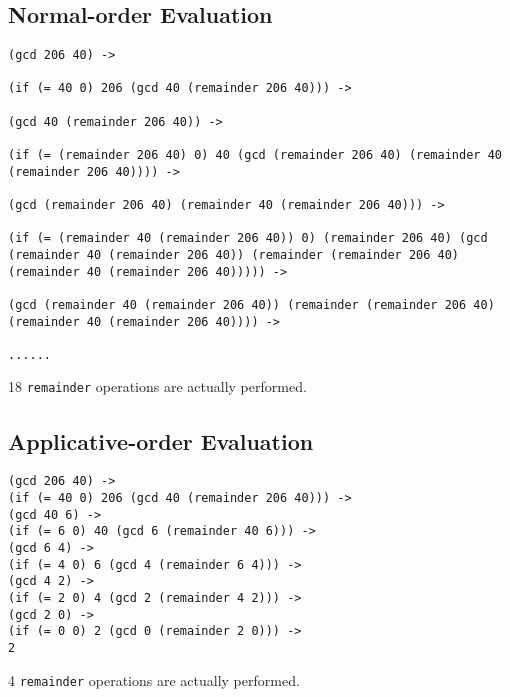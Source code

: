 \documentclass[../main.tex]{subfiles}
\begin{document}

\section{}

\subsection*{Normal-order Evaluation}

\begin{lstlisting}
(gcd 206 40) ->

(if (= 40 0) 206 (gcd 40 (remainder 206 40))) ->

(gcd 40 (remainder 206 40)) ->

(if (= (remainder 206 40) 0) 40 (gcd (remainder 206 40) (remainder 40 (remainder 206 40)))) ->

(gcd (remainder 206 40) (remainder 40 (remainder 206 40))) ->

(if (= (remainder 40 (remainder 206 40)) 0) (remainder 206 40) (gcd (remainder 40 (remainder 206 40)) (remainder (remainder 206 40) (remainder 40 (remainder 206 40))))) ->

(gcd (remainder 40 (remainder 206 40)) (remainder (remainder 206 40) (remainder 40 (remainder 206 40)))) ->

......
\end{lstlisting}

18 \lstinline{remainder} operations are actually performed.

\subsection*{Applicative-order Evaluation}

\begin{lstlisting}
(gcd 206 40) ->
(if (= 40 0) 206 (gcd 40 (remainder 206 40))) ->
(gcd 40 6) ->
(if (= 6 0) 40 (gcd 6 (remainder 40 6))) ->
(gcd 6 4) ->
(if (= 4 0) 6 (gcd 4 (remainder 6 4))) ->
(gcd 4 2) ->
(if (= 2 0) 4 (gcd 2 (remainder 4 2))) ->
(gcd 2 0) ->
(if (= 0 0) 2 (gcd 0 (remainder 2 0))) ->
2
\end{lstlisting}

4 \lstinline{remainder} operations are actually performed.


\section{}
\end{document}

